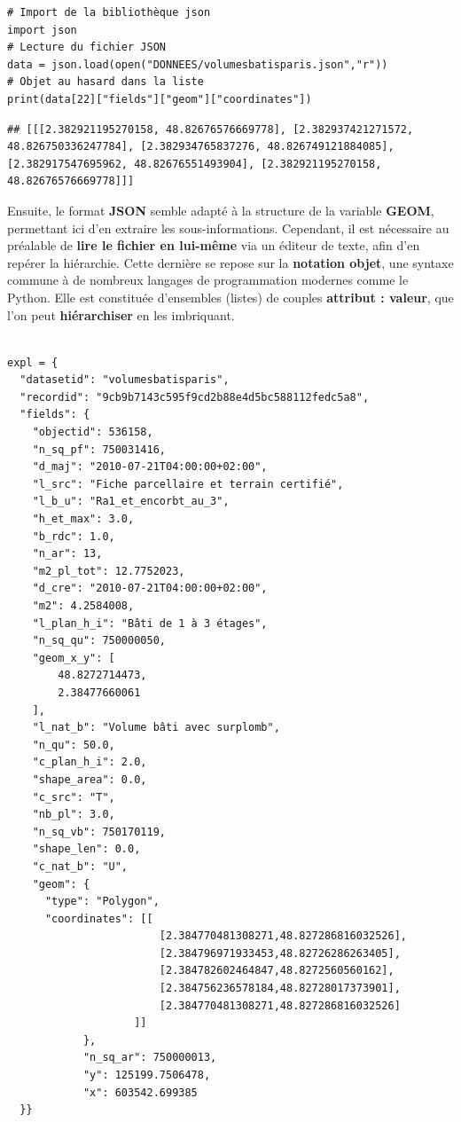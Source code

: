 \documentclass[
  11pt,
  french,
]{article}
\begin{document}
\begin{tcolorbox}[title= Format JSON ,colback=boitecode]
\begin{lstlisting}[style=code]
# Import de la bibliothèque json
import json
# Lecture du fichier JSON
data = json.load(open("DONNEES/volumesbatisparis.json","r"))
# Objet au hasard dans la liste
print(data[22]["fields"]["geom"]["coordinates"])\end{lstlisting}
\begin{lstlisting}[style=out]
## [[[2.382921195270158, 48.82676576669778], [2.382937421271572, 48.826750336247784], [2.382934765837276, 48.826749121884085], [2.382917547695962, 48.82676551493904], [2.382921195270158, 48.82676576669778]]]
\end{lstlisting}
\end{tcolorbox}

Ensuite, le format \textbf{JSON} semble adapté à la structure de la
variable \textbf{GEOM}, permettant ici d'en extraire les
sous-informations. Cependant, il est nécessaire au préalable de
\textbf{lire le fichier en lui-même} via un éditeur de texte, afin d'en
repérer la hiérarchie. Cette dernière se repose sur la \textbf{notation
objet}, une syntaxe commune à de nombreux langages de programmation
modernes comme le Python. Elle est constituée d'ensembles (listes) de
couples \textbf{attribut : valeur}, que l'on peut \textbf{hiérarchiser}
en les imbriquant.\\
~\\

\begin{tcolorbox}[title= Structure d'un volume et de ses données au format JSON ,colback=boitecode]
\begin{lstlisting}[style=code]
expl = {
  "datasetid": "volumesbatisparis",
  "recordid": "9cb9b7143c595f9cd2b88e4d5bc588112fedc5a8",
  "fields": {
    "objectid": 536158,
    "n_sq_pf": 750031416,
    "d_maj": "2010-07-21T04:00:00+02:00",
    "l_src": "Fiche parcellaire et terrain certifié",
    "l_b_u": "Ra1_et_encorbt_au_3",
    "h_et_max": 3.0,
    "b_rdc": 1.0,
    "n_ar": 13,
    "m2_pl_tot": 12.7752023,
    "d_cre": "2010-07-21T04:00:00+02:00",
    "m2": 4.2584008,
    "l_plan_h_i": "Bâti de 1 à 3 étages",
    "n_sq_qu": 750000050,
    "geom_x_y": [
        48.8272714473,
        2.38477660061
    ],
    "l_nat_b": "Volume bâti avec surplomb",
    "n_qu": 50.0,
    "c_plan_h_i": 2.0,
    "shape_area": 0.0,
    "c_src": "T",
    "nb_pl": 3.0,
    "n_sq_vb": 750170119,
    "shape_len": 0.0,
    "c_nat_b": "U",
    "geom": {
      "type": "Polygon",
      "coordinates": [[
                        [2.384770481308271,48.827286816032526],
                        [2.384796971933453,48.82726286263405],
                        [2.384782602464847,48.8272560560162],
                        [2.384756236578184,48.82728017373901],
                        [2.384770481308271,48.827286816032526]
                    ]]
            },
            "n_sq_ar": 750000013,
            "y": 125199.7506478,
            "x": 603542.699385
  }}\end{lstlisting}
\end{tcolorbox}
\end{document}
